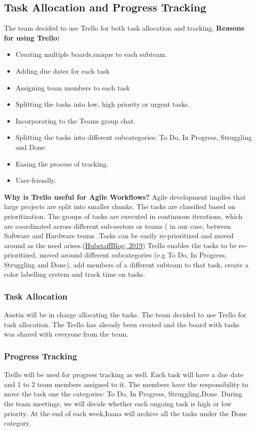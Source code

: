 \documentclass{article}
\begin{document}
\subsection{Task Allocation and Progress Tracking}
The team decided to use Trello for both task allocation and tracking. 
\newline 
\textbf{Reasons for using Trello:}
\begin{itemize}
\item Creating multiple boards,unique to each subteam.
\item Adding due dates for each task
\item Assigning team members to each task
\item Splitting the tasks into low, high priority or urgent tasks.
\item Incorporating to the Teams group chat. 
\item Splitting the tasks into different subcategories: To Do, In Progress, Struggling and Done. 
\item Easing the process of tracking.
\item User-friendly. 
\end{itemize}
\textbf{Why is Trello useful for Agile Workflows? }
\newline
\newline
Agile development implies  that large projects are split into smaller chunks. The tasks are classified based on prioritization. The groups of tasks are executed in continuous iterations, which are coordinated across different sub-sectors or teams ( in our case, between Software and Hardware teams .Tasks can be easily re-prioritized and moved around as the need arises.(\href{https://blog.hubstaff.com/agile-trello/#:~:text=Because\%20it's\%20so\%20easy\%20to,stages\%2C\%20roles\%2C\%20and\%20deadlines.}{HubstaffBlog, 2019})
\newline
Trello enables the tasks to be re-prioritized, moved around different subcategories (e.g To Do, In Progress, Struggling and Done), add members of a different subteam to that task, create a color labelling system  and track time on tasks. 

\subsubsection{Task Allocation}

Austin will be in charge allocating the  tasks. The team decided to use Trello for task allocation. The Trello has already been created and the board with tasks was shared with everyone from the team. 

\subsubsection{Progress Tracking}

Trello will be used for progress tracking as well. Each task will have a due date and 1 to 2 team members assigned to it. The members have the responsibility to move the task one the categories: To Do, In Progress, Struggling,Done. During the team meetings, we will decide whether each ongoing task is high or low priority. At the end of each week,Ioana will archive all the tasks under the Done category.
\end{document}
